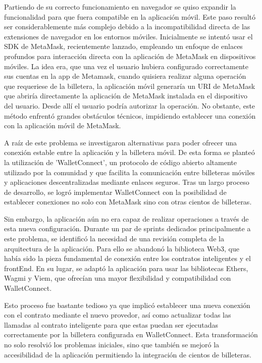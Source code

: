 Partiendo de su correcto funcionamiento en navegador se quiso expandir la funcionalidad para que fuera compatible en la aplicación móvil.
Este paso resultó ser considerablemente más complejo debido a la incompatibilidad directa de las extensiones de navegador en los entornos móviles. 
Inicialmente se intentó usar el SDK de MetaMask, recientemente lanzado, empleando un enfoque de enlaces profundos para interacción directa con la aplicación de MetaMask en dispositivos móviles.
La idea era, que una vez el usuario hubiera configurado correctamente sus cuentas en la app de Metamask, cuando quisiera realizar alguna operación que requeriese de la billetera, la aplicación móvil generaría un URI de MetaMask que abriría directamente la aplicación de MetaMask instalada en el dispositivo del usuario. Desde allí el usuario podría autorizar la operación.
No obstante, este método enfrentó grandes obstáculos técnicos, impidiendo establecer una conexión con la aplicación móvil de MetaMask.

A raíz de este problema se investigaron alternativas para poder ofrecer una conexión estable entre la aplicación y la billetera móvil. De esta forma se planteó la utilización de 'WalletConnect', un protocolo de código abierto altamente utilizado por la comunidad y que facilita la comunicación entre billeteras móviles y aplicaciones descentralizadas mediante enlaces seguros. Tras un largo proceso de desarrollo, se logró implementar WalletConnect con la posibilidad de establecer conexiones no solo con MetaMask sino con otras cientos de billeteras.

Sin embargo, la aplicación aún no era capaz de realizar operaciones a través de esta nueva configuración. Durante un par de sprints dedicados principalmente a este problema, se identificó la necesidad de una revisión completa de la arquitectura de la aplicación. 
Para ello se abandonó la biblioteca Web3, que había sido la pieza fundamental de conexión entre los contratos inteligentes y el frontEnd.
En su lugar, se adaptó la aplicación para usar las bibliotecas Ethers, Wagmi y Viem, que ofrecían una mayor flexibilidad y compatibilidad con WalletConnect.

Esto proceso fue bastante tedioso ya que implicó establecer una nueva conexión con el contrato mediante el nuevo provedor, así como actualizar todas las llamadas al contrato inteligente para que estas puedan ser ejecutadas correctamente por la billetera configurada en WalletConnect.
Esta transformación no solo resolvió los problemas iniciales, sino que también se mejoró la accesibilidad de la aplicación permitiendo la integración de cientos de billeteras.




